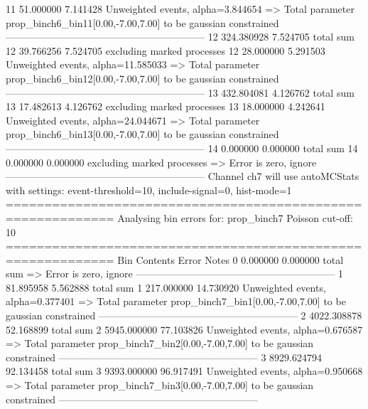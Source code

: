 11         51.000000       7.141428        Unweighted events, alpha=3.844654
  => Total parameter prop_binch6_bin11[0.00,-7.00,7.00] to be gaussian constrained
------------------------------------------------------------
12         324.380928      7.524705        total sum                     
12         39.766256       7.524705        excluding marked processes    
12         28.000000       5.291503        Unweighted events, alpha=11.585033
  => Total parameter prop_binch6_bin12[0.00,-7.00,7.00] to be gaussian constrained
------------------------------------------------------------
13         432.804081      4.126762        total sum                     
13         17.482613       4.126762        excluding marked processes    
13         18.000000       4.242641        Unweighted events, alpha=24.044671
  => Total parameter prop_binch6_bin13[0.00,-7.00,7.00] to be gaussian constrained
------------------------------------------------------------
14         0.000000        0.000000        total sum                     
14         0.000000        0.000000        excluding marked processes    
  => Error is zero, ignore      
------------------------------------------------------------
Channel ch7 will use autoMCStats with settings: event-threshold=10, include-signal=0, hist-mode=1
============================================================
Analysing bin errors for: prop_binch7
Poisson cut-off: 10
============================================================
Bin        Contents        Error           Notes                         
0          0.000000        0.000000        total sum                     
  => Error is zero, ignore      
------------------------------------------------------------
1          81.895958       5.562888        total sum                     
1          217.000000      14.730920       Unweighted events, alpha=0.377401
  => Total parameter prop_binch7_bin1[0.00,-7.00,7.00] to be gaussian constrained
------------------------------------------------------------
2          4022.308878     52.168899       total sum                     
2          5945.000000     77.103826       Unweighted events, alpha=0.676587
  => Total parameter prop_binch7_bin2[0.00,-7.00,7.00] to be gaussian constrained
------------------------------------------------------------
3          8929.624794     92.134458       total sum                     
3          9393.000000     96.917491       Unweighted events, alpha=0.950668
  => Total parameter prop_binch7_bin3[0.00,-7.00,7.00] to be gaussian constrained
------------------------------------------------------------
